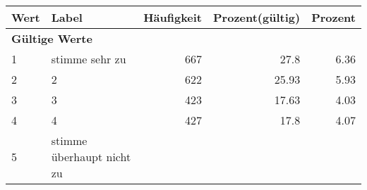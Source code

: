      \begin{longtable}{lXrrr}
     \toprule
     \textbf{Wert} & \textbf{Label} & \textbf{Häufigkeit} & \textbf{Prozent(gültig)} & \textbf{Prozent} \\
     \endhead
     \midrule
     \multicolumn{5}{l}{\textbf{Gültige Werte}}\\

     1 &
     \multicolumn{1}{X}{ stimme sehr zu   } &


       \num{667} &
       \num[round-mode=places,round-precision=2]{27.8} &
         \num[round-mode=places,round-precision=2]{6.36} \\

     2 &
     \multicolumn{1}{X}{ 2   } &


       \num{622} &
       \num[round-mode=places,round-precision=2]{25.93} &
         \num[round-mode=places,round-precision=2]{5.93} \\

     3 &
     \multicolumn{1}{X}{ 3   } &


       \num{423} &
       \num[round-mode=places,round-precision=2]{17.63} &
         \num[round-mode=places,round-precision=2]{4.03} \\

     4 &
     \multicolumn{1}{X}{ 4   } &


       \num{427} &
       \num[round-mode=places,round-precision=2]{17.8} &
         \num[round-mode=places,round-precision=2]{4.07} \\

     5 &
     \multicolumn{1}{X}{ stimme überhaupt nicht zu   } &



\end{longtable}
